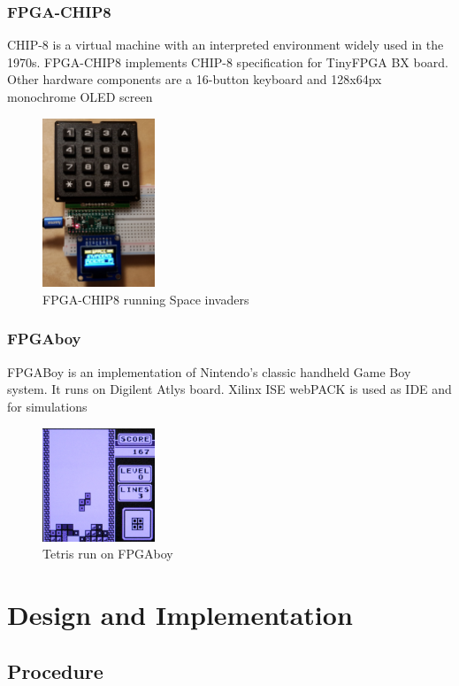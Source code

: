 \documentclass[a4paper,12pt]{article}
\begin{document}
    \subsubsection{FPGA-CHIP8} 
    CHIP-8 is a virtual machine with an interpreted environment widely used in the 1970s.
    FPGA-CHIP8 implements CHIP-8 specification for TinyFPGA BX board. Other hardware components are a 16-button keyboard and 128x64px monochrome OLED screen
    \begin{figure}[H]
    \centering
    \includegraphics[width=0.3\textwidth]{images/chip8-fpga.png} 
    \caption{FPGA-CHIP8 running Space invaders}
    \end{figure}

    \subsubsection{FPGAboy} 
    FPGABoy is an implementation of Nintendo's classic handheld Game Boy system. It runs on Digilent Atlys board. Xilinx ISE webPACK is used as IDE and for simulations
    \begin{figure}[h]
    \centering
    \includegraphics[width=0.3\textwidth]{images/fpgaboy.png} 
    \caption{Tetris run on FPGAboy}
    \end{figure} 
    \newpage
    \section{Design and Implementation}
    \subsection{Procedure}
\end{document}
